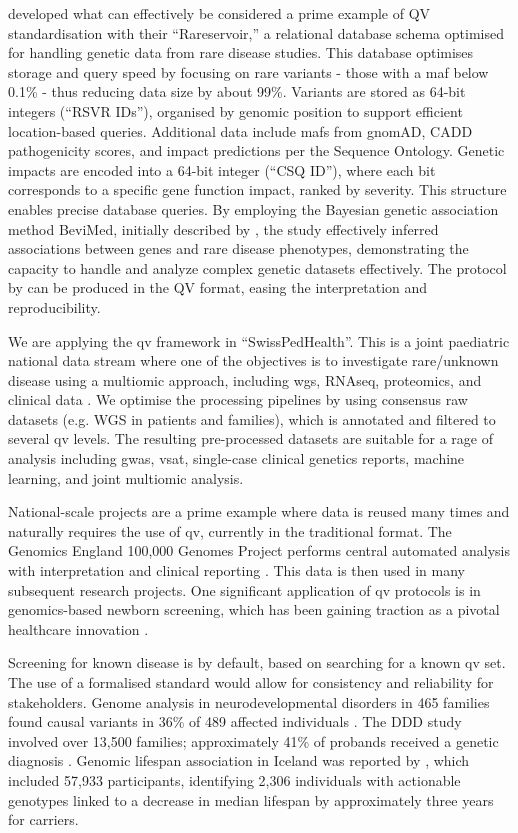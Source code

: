 \citet{greene2023genetic} developed what can effectively be considered a prime example of QV standardisation with their ``Rareservoir,'' a relational database schema optimised for handling genetic data from rare disease studies.
This database optimises storage and query speed by focusing on rare variants - those with a \ac{maf} below 0.1\% - thus reducing data size by about 99\%. Variants are stored as 64-bit integers (``RSVR IDs''), organised by genomic position to support efficient location-based queries. 
Additional data include \ac{maf}s from gnomAD, CADD pathogenicity scores, and impact predictions per the Sequence Ontology. Genetic impacts are encoded into a 64-bit integer (``CSQ ID''), where each bit corresponds to a specific gene function impact, ranked by severity. 
This structure enables precise database queries. 
By employing the Bayesian genetic association method BeviMed, initially described by \citet{greene2017fast}, the study effectively inferred associations between genes and rare disease phenotypes, demonstrating the capacity to handle and analyze complex genetic datasets effectively.
 The protocol by \citet{greene2023genetic} can be produced in the QV format, easing the interpretation and reproducibility.

We are applying the \ac{qv} framework in ``SwissPedHealth''. 
This is a joint paediatric national data stream where one of the objectives is to investigate rare/unknown disease using a multiomic approach, including \ac{wgs}, RNAseq, proteomics, and clinical data
\cite{mozun2024paediatric}.
We optimise the processing pipelines by using consensus raw datasets (e.g. WGS in patients and families), which is annotated and filtered to several \ac{qv} levels.
The resulting pre-processed datasets are suitable for a rage of analysis including \ac{gwas}, \ac{vsat}, single-case clinical genetics reports, machine learning, and joint multiomic analysis. 

National-scale projects are a prime example where data is reused many times and naturally requires the use of \ac{qv}, currently in the traditional format.
The  Genomics England 100,000 Genomes Project performs central automated analysis with interpretation and clinical reporting \cite{turnbull2018100}. 
This data is then used in many subsequent research projects. 
One significant application of \ac{qv} protocols is in genomics-based newborn screening, which has been gaining traction as a pivotal healthcare innovation
\cite{noauthor_every_2024}. 

Screening for known disease is by default, based on searching for a known \ac{qv} set. 
The use of a formalised standard would allow for consistency and reliability for stakeholders. 
Genome analysis in neurodevelopmental disorders in 465 families found causal variants in 36\% of 489 affected individuals \citep{sanchis2023genome}.
The DDD study involved over 13,500 families; approximately 41\% of probands received a genetic diagnosis \cite{wright2023genomic}.
Genomic lifespan association in Iceland was reported by \citet{jensson2023actionable}, which included 57,933 participants, identifying 2,306 individuals with actionable genotypes linked to a decrease in median lifespan by approximately three years for carriers.


